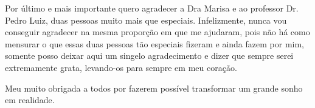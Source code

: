 Por último e mais importante quero agradecer a Dra Marisa e ao professor Dr. Pedro Luiz, duas pessoas muito mais que especiais. Infelizmente, nunca vou conseguir agradecer na mesma proporção em que me ajudaram, pois não há como mensurar o que essas duas pessoas tão especiais fizeram e ainda fazem por mim, somente posso deixar aqui um singelo agradecimento e dizer que sempre serei extremamente grata, levando-os para sempre em meu coração.

Meu muito obrigada a todos por fazerem possível transformar um grande sonho em realidade.